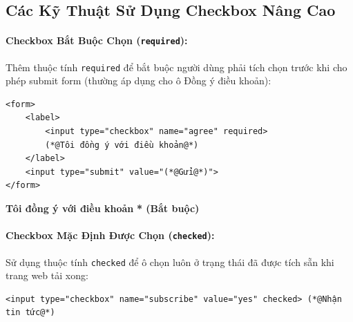 \documentclass[11pt,oneside]{book}
\newcommand{\codeinline}[1]{\textcolor{accentOrange}{\texttt{#1}}}
\begin{document}
\subsection{Các Kỹ Thuật Sử Dụng Checkbox Nâng Cao}

\paragraph{Checkbox Bắt Buộc Chọn (\codeinline{required}):}
Thêm thuộc tính \codeinline{required} để bắt buộc người dùng phải tích chọn trước khi cho phép submit form (thường áp dụng cho ô Đồng ý điều khoản):

\begin{codeWindow}
\begin{lstlisting}[language=HTML5]
<form>
    <label>
        <input type="checkbox" name="agree" required> 
        (*@Tôi đồng ý với điều khoản@*)
    </label>
    <input type="submit" value="(*@Gửi@*)">
</form>
\end{lstlisting}
\end{codeWindow}

\begin{browserWindow}
\sffamily\small
{} \; \textbf{Tôi đồng ý với điều khoản} \quad \textcolor{accentOrange}{\small\textbf{* (Bắt buộc)}} \\[6pt]
\end{browserWindow}

\paragraph{Checkbox Mặc Định Được Chọn (\codeinline{checked}):}
Sử dụng thuộc tính \codeinline{checked} để ô chọn luôn ở trạng thái đã được tích sẵn khi trang web tải xong:

\begin{codeWindow}
\begin{lstlisting}[language=HTML5]
<input type="checkbox" name="subscribe" value="yes" checked> (*@Nhận tin tức@*)
\end{lstlisting}
\end{codeWindow}
\end{document}
